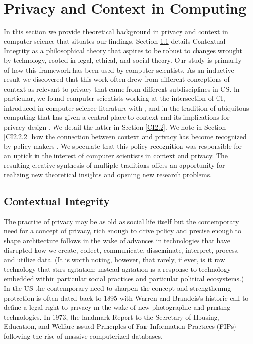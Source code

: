 \documentclass[../thesis.tex]{subfiles}
\begin{document}
\section{Privacy and Context in Computing}
\label{CI2}

In this section we provide theoretical
background in privacy and context in computer science that situates our
findings. Section \ref{CI2.1} details Contextual Integrity as a philosophical
theory that aspires to be robust to changes wrought by technology,
rooted in legal, ethical, and social theory. Our study is primarily of
how this framework has been used by computer scientists. As an
inductive result we discovered that this work often drew from different
conceptions of context as relevant to privacy that came from different
subdisciplines in CS. In particular, we found computer scientists
working at the intersection of CI, introduced in computer science
literature with \citet{barth06sp}, and in the tradition of ubiquitous
computing that has given a central place to context and its
implications for privacy design \citep{dey2001conceptual, dourish2004we}.
We detail the latter in Section \ref{CI2.2}.
We note in Section \ref{CI2.2.2} how the
connection between context and privacy has become recognized by
policy-makers \citep{house2012consumer, wef2012rethinking}. We
speculate that this policy recognition was responsible for an uptick in
the interest of computer scientists in context and
privacy. The resulting creative synthesis
of multiple traditions offers an opportunity for realizing new
theoretical insights and opening new research problems.

\subsection{Contextual Integrity}
\label{CI2.1}

The practice of privacy may be as old as social life itself but the
contemporary need for a concept of privacy, rich enough to drive policy
and precise enough to shape architecture follows in the wake of
advances in technologies that have disrupted how we create, collect,
communicate, disseminate, interpret, process, and utilize data. (It is
worth noting, however, that rarely, if ever, is it raw technology that
stirs agitation; instead agitation is a response to technology embedded
within particular social practices and particular political
ecosystems.)
In the US the contemporary need to sharpen the concept
and strengthening protection is often dated back to 1895 with Warren
and Brandeis's historic call to define a legal right to
privacy in the wake of new photographic and printing technologies. In
1973, the landmark Report to the Secretary of Housing, Education, and
Welfare issued Principles of Fair Information Practices (FIPs)
following the rise of massive computerized databases. 
\end{document}

